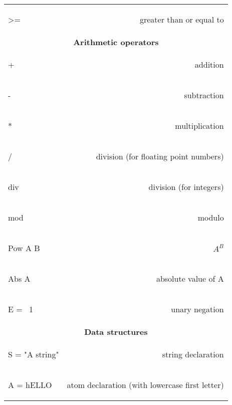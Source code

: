 \documentclass[12pt]{article}
\begin{document}
\begin{longtable}{l r}
\begin{oz}
>=
\end{oz}
&greater than or equal to\\[0.4em]


\multicolumn{2}{c}{\textbf{Arithmetic operators}}\\
\begin{oz}
+
\end{oz}
&addition\\
 
\begin{oz}
-
\end{oz}
&subtraction\\
 
\begin{oz}
*
\end{oz}
&multiplication\\
 
\begin{oz}
/
\end{oz}
&division (for floating point numbers)\\
 
\begin{oz}
div
\end{oz}
&division (for integers)\\
 
\begin{oz}
mod
\end{oz}
&modulo\\
 
\begin{oz}
{Pow A B}
\end{oz}
&$A^{B}$\\
 
\begin{oz}
{Abs A}
\end{oz}
&absolute value of A\\

\begin{oz}
E = ~1
\end{oz}
&unary negation\\[0.4em]
 


\multicolumn{2}{c}{\textbf{Data structures}}\\

\begin{oz}
S = "A string"
\end{oz}
& string declaration\\

\begin{oz}
A = hELLO
\end{oz}
& atom declaration (with lowercase first letter)\\


\end{longtable}
\end{document}
